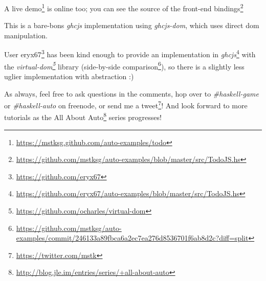 \documentclass[]{article}
\renewcommand{\href}[2]{#2\footnote{\url{#1}}}
\begin{document}
A \href{https://mstksg.github.com/auto-examples/todo}{live demo} is online too;
you can see
\href{https://github.com/mstksg/auto-examples/blob/master/src/TodoJS.hs}{the
source of the front-end bindings}

This is a bare-bons \emph{ghcjs} implementation using \emph{ghcjs-dom}, which
uses direct dom manipulation.

User \href{https://github.com/eryx67}{eryx67} has been kind enough to provide
\href{https://github.com/eryx67/auto-examples/blob/master/src/TodoJS.hs}{an
implementation in \emph{ghcjs}} with the
\emph{\href{https://github.com/ocharles/virtual-dom}{virtual-dom}} library
(\href{https://github.com/mstksg/auto-examples/commit/246133a89fbca6a2ec7ea276d8536701f6ab8d2c?diff=split}{side-by-side
comparison}), so there is a slightly less uglier implementation with abstraction
:)

As always, feel free to ask questions in the comments, hop over to
\emph{\#haskell-game} or \emph{\#haskell-auto} on freenode, or send me a
\href{https://twitter.com/mstk}{tweet}! And look forward to more tutorials as
the \href{http://blog.jle.im/entries/series/+all-about-auto}{All About Auto}
series progresses!
\end{document}
